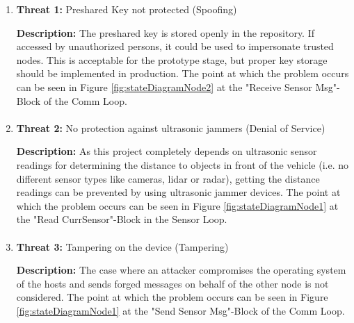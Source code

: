 \begin{enumerate}
		\item \textbf{Threat 1:} Preshared Key not protected (Spoofing)

            \textbf{Description:} The preshared key is stored openly in the repository. If accessed by unauthorized persons, it could be used to impersonate trusted nodes. This is acceptable for the prototype stage, but proper key storage should be implemented in production. The point at which the problem occurs can be seen in Figure \ref{fig:stateDiagramNode2} at the "Receive Sensor Msg"-Block of the Comm Loop.
            
        \paragraph{}
		\item \textbf{Threat 2:} No protection against ultrasonic jammers (Denial of Service)
        
            \textbf{Description:} As this project completely depends on ultrasonic sensor readings for determining the distance to objects in front of the vehicle (i.e. no different sensor types like cameras, lidar or radar), getting the distance readings can be prevented by using ultrasonic jammer devices. The point at which the problem occurs can be seen in Figure \ref{fig:stateDiagramNode1} at the "Read CurrSensor"-Block in the Sensor Loop.
            
        \paragraph{}
		\item \textbf{Threat 3:} Tampering on the device (Tampering)
        
            \textbf{Description:} The case where an attacker compromises the operating system of the hosts and sends forged messages on behalf of the other node is not considered. The point at which the problem occurs can be seen in Figure \ref{fig:stateDiagramNode1} at the "Send Sensor Msg"-Block of the Comm Loop.
	\end{enumerate}
